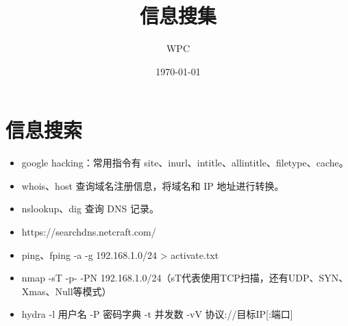 \documentclass[UTF8]{ctexart}
\title{信息搜集}
\author{WPC}
\date{\today}
\begin{document}
\maketitle

\section{信息搜索}
\begin{itemize}
	\item google hacking：常用指令有 site、inurl、intitle、allintitle、filetype、cache。
	\item whois、host 查询域名注册信息，将域名和 IP 地址进行转换。
	\item nslookup、dig 查询 DNS 记录。
	\item https://searchdns.netcraft.com/
	\item ping、fping -a -g 192.168.1.0/24 > activate.txt
	\item nmap -sT -p- -PN 192.168.1.0/24（sT代表使用TCP扫描，还有UDP、SYN、Xmas、Null等模式）
	\item hydra -l 用户名 -P 密码字典 -t 并发数 -vV 协议://目标IP[:端口]
\end{itemize}
\end{document}
